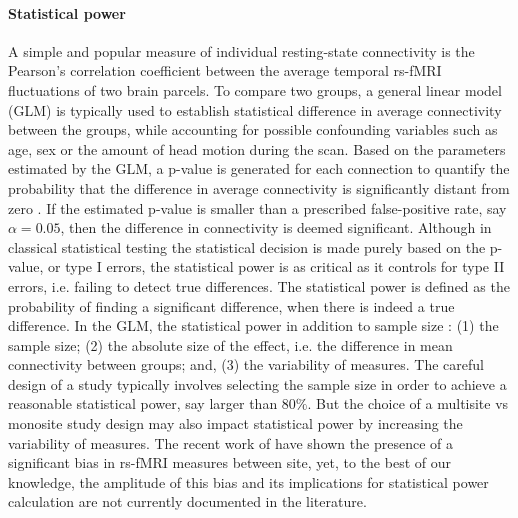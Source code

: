 \documentclass[authoryear]{elsarticle}
\begin{document}
\paragraph{Statistical power}
A simple and popular measure of individual resting-state connectivity is the Pearson’s correlation coefficient between the average temporal rs-fMRI fluctuations of two brain parcels. To compare two groups, a general linear model (GLM) is typically used to establish statistical difference in average connectivity between the groups, while accounting for possible confounding variables such as age, sex or the amount of head motion during the scan. Based on the parameters estimated by the GLM, a p-value is generated for each connection to quantify the probability that the difference in average connectivity is significantly distant from zero \citep{Worsley1995}. If the estimated p-value is smaller than a prescribed false-positive rate, say $\alpha=0.05$, then the difference in connectivity is deemed significant. Although in classical statistical testing the statistical decision is made purely based on the p-value, or type I errors, the statistical power is as critical as it controls for type II errors, i.e. failing to detect true differences. The statistical power is defined as the probability of finding a significant difference, when there is indeed a true difference. In the GLM, the statistical power in addition to sample size \citep{Desmond2002}: (1) the sample size; (2) the absolute size of the effect, i.e. the difference in mean connectivity between groups; and, (3) the variability of measures. 
The careful design of a study typically involves selecting the sample size in order to achieve a reasonable statistical power, say larger than $80\%$. But the choice of a multisite vs monosite study design may also impact statistical power by increasing the variability of measures. The recent work of \cite{Yang2014} have shown the presence of a significant bias in rs-fMRI measures between site, yet, to the best of our knowledge, the amplitude of this bias and its implications for statistical power calculation are not currently documented in the literature. 
\end{document}
